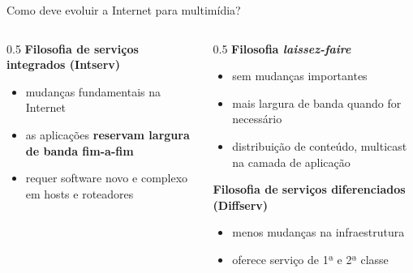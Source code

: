 \documentclass[aspectratio=169,11pt]{beamer}
\begin{document}
\begin{frame}{Como deve evoluir a Internet para multimídia?}
  \begin{columns}
    \begin{column}{0.5\textwidth}
      \textbf{Filosofia de serviços integrados (Intserv)}
      \begin{itemize}
        \item mudanças fundamentais na Internet
        \item as aplicações \textbf{reservam largura de banda fim-a-fim}
        \item requer software novo e complexo em hosts e roteadores
      \end{itemize}
    \end{column}
    \begin{column}{0.5\textwidth}
      \textbf{Filosofia \emph{laissez-faire}}
      \begin{itemize}
        \item sem mudanças importantes
        \item mais largura de banda quando for necessário
        \item distribuição de conteúdo, multicast na camada de aplicação
      \end{itemize}
      \textbf{Filosofia de serviços diferenciados (Diffserv)}
      \begin{itemize}
        \item menos mudanças na infraestrutura
        \item oferece serviço de 1ª e 2ª classe
      \end{itemize}
    \end{column}
  \end{columns}
\end{frame}
\end{document}
